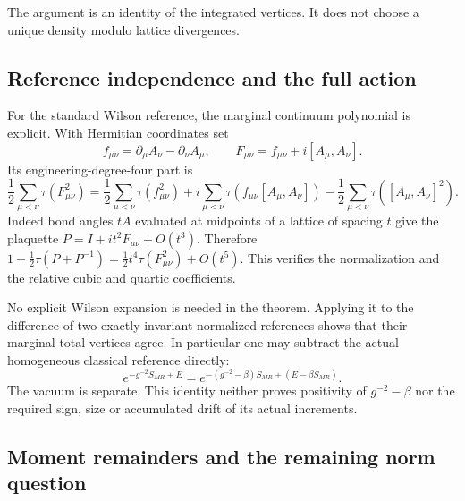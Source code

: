 \documentclass[11pt]{article}
\theoremstyle{remark}
\begin{document}
The argument is an identity of the integrated vertices.
It does not choose a unique density modulo lattice divergences.

\subsection{Reference independence and the full action}
\label{tkw-full-action-section}

For the standard Wilson reference, the marginal continuum
polynomial is explicit. With Hermitian coordinates set
\[
 f_{\mu\nu}=\partial_\mu A_\nu-\partial_\nu A_\mu,
 \qquad F_{\mu\nu}=f_{\mu\nu}+i[A_\mu,A_\nu].
\]
Its engineering-degree-four part is
\begin{equation}
 \frac12\sum_{\mu<\nu}\tau(F_{\mu\nu}^2)
 =\frac12\sum_{\mu<\nu}\tau(f_{\mu\nu}^2)
   +i\sum_{\mu<\nu}\tau(f_{\mu\nu}[A_\mu,A_\nu])
   -\frac12\sum_{\mu<\nu}\tau([A_\mu,A_\nu]^2).
 \label{tkw-Wilson-polynomial}
\end{equation}
Indeed bond angles \(tA\) evaluated at midpoints of a
lattice of spacing \(t\) give the plaquette
\(P=I+it^2F_{\mu\nu}+O(t^3)\). Therefore
\(1-\frac12\tau(P+P^{-1})
 =\frac12t^4\tau(F_{\mu\nu}^2)+O(t^5)\).
This verifies the normalization and the relative cubic
and quartic coefficients.

No explicit Wilson expansion is needed in the theorem.
Applying it to the difference of two exactly invariant
normalized references shows that their marginal total
vertices agree. In particular one may subtract the actual
homogeneous classical reference directly:
\begin{equation}
 e^{-g^{-2}S_{MR}+E}
  =e^{-(g^{-2}-\beta)S_{MR}+(E-\beta S_{MR})}.
 \label{tkw-coupling-rebase}
\end{equation}
The vacuum is separate. This identity neither proves
positivity of \(g^{-2}-\beta\) nor the required sign,
size or accumulated drift of its actual increments.

\subsection{Moment remainders and the remaining norm question}
\label{tkw-scope-section}
\end{document}
